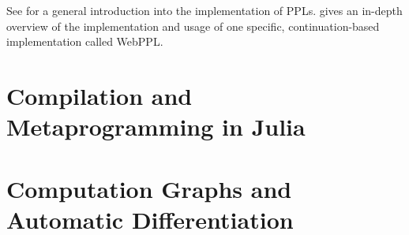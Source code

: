 See \textcite{vandemeent2018introduction} for a general introduction into the implementation of
PPLs. \Textcite{goodman2014design} gives an in-depth overview of the implementation and usage of one
specific, continuation-based implementation called WebPPL.

\section{Compilation and Metaprogramming in Julia}
\label{sec:comp-metapr-julia}

\textcite{singer2018introduction}


\section{Computation Graphs and Automatic Differentiation}
\label{sec:graph-track-autom}




